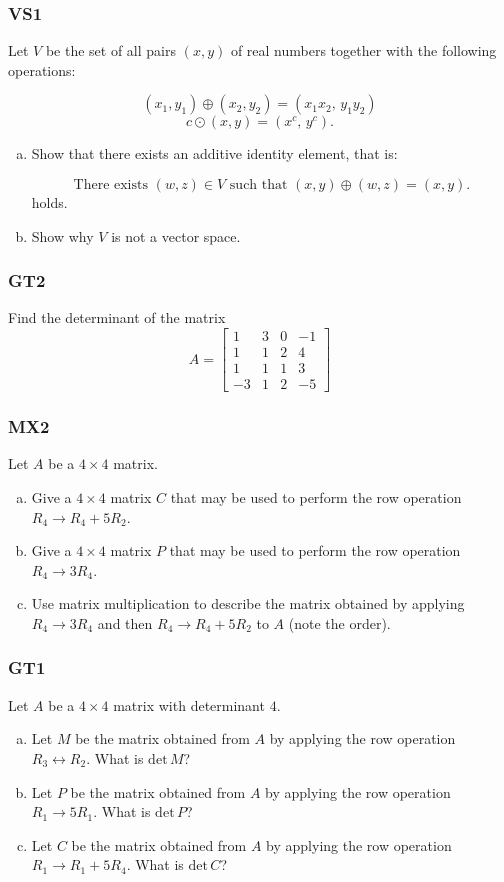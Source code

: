 \documentclass[aspectratio=1610]{beamer}
\begin{document}
\begin{frame}
\frametitle{VS1}
Let \(V\) be the set of all pairs \((x,y)\) of real numbers together with the following operations: 

 \[(x_1,y_1)\oplus (x_2,y_2)=\left(x_{1} x_{2},\,y_{1} y_{2}\right)\]\[c \odot (x,y) =\left(x^{c},\,y^{c}\right).\] 


\begin{enumerate}[(a)]
\item Show that there exists an additive identity element, that is: 

 \[
      \text{There exists }(w,z)\in V\text{ such that }(x,y)\oplus(w,z)=(x,y).
    \] 
holds.
\item Show why \(V\) is not a vector space.
\end{enumerate}

\end{frame}


\begin{frame}\frametitle{GT2}
Find the determinant of the matrix
\[
  A
    =
  \begin{bmatrix}
    1 & 3 & 0 & -1 \\
    1 & 1 & 2 & 4 \\
    1 & 1 & 1 & 3 \\
    -3 & 1 & 2 & -5
  \end{bmatrix}
\]
\end{frame}

\begin{frame}\frametitle{MX2}
Let \(A\) be a \(4 \times 4\) matrix.

 

\begin{enumerate}[(a)]
\item Give a \(4 \times 4\) matrix \(C\) that may be used to perform the row operation \(R_4 \to R_4 + 5R_2\).
\item Give a \(4 \times 4\) matrix \(P\) that may be used to perform the row operation \(R_4 \to 3R_4\).
\item Use matrix multiplication to describe the matrix obtained by applying \(R_4 \to 3R_4\) and then \(R_4 \to R_4 + 5R_2\) to \(A\) (note the order). 
\end{enumerate}
\end{frame}

\begin{frame}\frametitle{GT1}
Let \(A\) be a \(4 \times 4\) matrix with determinant \(4\).

 

\begin{enumerate}[(a)]
\item Let \(M\) be the matrix obtained from \(A\) by applying the row operation \(R_3 \leftrightarrow R_2\). What is \(\mathrm{det}\,M\)?
\item Let \(P\) be the matrix obtained from \(A\) by applying the row operation \(R_1 \to 5R_1\). What is \(\mathrm{det}\,P\)?
\item Let \(C\) be the matrix obtained from \(A\) by applying the row operation \(R_1 \to R_1 + 5R_4\). What is \(\mathrm{det}\,C\)?
\end{enumerate}
\end{frame}
\end{document}
